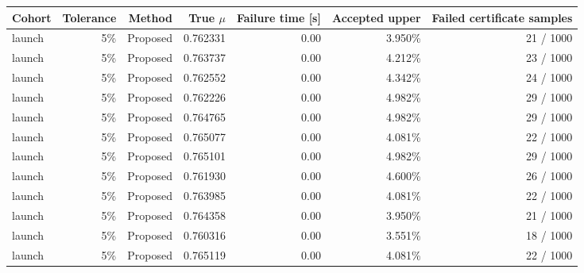 \begin{tabular}{lrrrrrr}
\toprule
Cohort & Tolerance & Method & True $\mu$ & Failure time [s] & Accepted upper & Failed certificate samples \\
\midrule
launch & 5\% & Proposed & 0.762331 & 0.00 & 3.950\% & 21 / 1000 \\
launch & 5\% & Proposed & 0.763737 & 0.00 & 4.212\% & 23 / 1000 \\
launch & 5\% & Proposed & 0.762552 & 0.00 & 4.342\% & 24 / 1000 \\
launch & 5\% & Proposed & 0.762226 & 0.00 & 4.982\% & 29 / 1000 \\
launch & 5\% & Proposed & 0.764765 & 0.00 & 4.982\% & 29 / 1000 \\
launch & 5\% & Proposed & 0.765077 & 0.00 & 4.081\% & 22 / 1000 \\
launch & 5\% & Proposed & 0.765101 & 0.00 & 4.982\% & 29 / 1000 \\
launch & 5\% & Proposed & 0.761930 & 0.00 & 4.600\% & 26 / 1000 \\
launch & 5\% & Proposed & 0.763985 & 0.00 & 4.081\% & 22 / 1000 \\
launch & 5\% & Proposed & 0.764358 & 0.00 & 3.950\% & 21 / 1000 \\
launch & 5\% & Proposed & 0.760316 & 0.00 & 3.551\% & 18 / 1000 \\
launch & 5\% & Proposed & 0.765119 & 0.00 & 4.081\% & 22 / 1000 \\
\bottomrule
\end{tabular}
